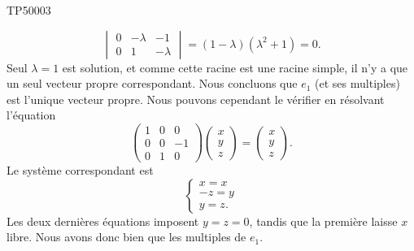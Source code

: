 \begin{corrige}{TP50003}
\begin{enumerate}
\begin{equation}
\begin{vmatrix}
					0	&	-\lambda	&	-1	\\
					0	&	1	&	-\lambda
				\end{vmatrix}=(1-\lambda)(\lambda^2+1)=0.
			\end{equation}
			Seul $\lambda=1$ est solution, et comme cette racine est une racine simple, il n'y a que un seul vecteur propre correspondant. Nous concluons que $e_1$ (et ses multiples) est l'unique vecteur propre.
			Nous pouvons cependant le vérifier en résolvant l'équation
			\begin{equation}
				\begin{pmatrix}
					1	&	0	&	0	\\
					0	&	0	&	-1	\\
					0	&	1	&	0
				\end{pmatrix}\begin{pmatrix}
					x	\\ 
					y	\\ 
					z	
				\end{pmatrix}=\begin{pmatrix}
					x	\\ 
					y	\\ 
					z	
				\end{pmatrix}.
			\end{equation}
			Le système correspondant est
			\begin{equation}
				\begin{cases}
					x=x\\
					-z=y\\
					y=z.
				\end{cases}
			\end{equation}
			Les deux dernières équations imposent $y=z=0$, tandis que la première laisse $x$ libre. Nous avons donc bien que les multiples de $e_1$.



\end{enumerate}
\end{corrige}
